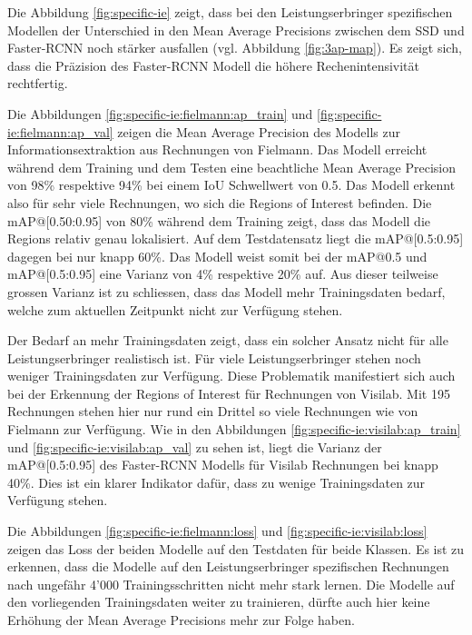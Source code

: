 Die Abbildung \ref{fig:specific-ie} zeigt, dass bei den Leistungserbringer spezifischen Modellen der Unterschied in den Mean Average Precisions zwischen dem SSD und Faster-RCNN noch stärker ausfallen (vgl. Abbildung \ref{fig:3ap-map}). Es zeigt sich, dass die Präzision des Faster-RCNN Modell die höhere Rechenintensivität rechtfertig.

Die Abbildungen \ref{fig:specific-ie:fielmann:ap_train} und \ref{fig:specific-ie:fielmann:ap_val} zeigen die Mean Average Precision des Modells zur Informationsextraktion aus Rechnungen von Fielmann. Das Modell erreicht während dem Training und dem Testen eine beachtliche Mean Average Precision von 98\% respektive 94\% bei einem IoU Schwellwert von 0.5. Das Modell erkennt also für sehr viele Rechnungen, wo sich die Regions of Interest befinden. Die mAP@[0.50:0.95] von 80\% während dem Training zeigt, dass das Modell die Regions relativ genau lokalisiert. Auf dem Testdatensatz liegt die mAP@[0.5:0.95] dagegen bei nur knapp 60\%. Das Modell weist somit bei der mAP@0.5 und mAP@[0.5:0.95] eine Varianz von 4\% respektive 20\% auf. Aus dieser teilweise grossen Varianz ist zu schliessen, dass das Modell mehr Trainingsdaten bedarf, welche zum aktuellen Zeitpunkt nicht zur Verfügung stehen.

Der Bedarf an mehr Trainingsdaten zeigt, dass ein solcher Ansatz nicht für alle Leistungserbringer realistisch ist. Für viele Leistungserbringer stehen noch weniger Trainingsdaten zur Verfügung. Diese Problematik manifestiert sich auch bei der Erkennung der Regions of Interest für Rechnungen von Visilab. Mit 195 Rechnungen stehen hier nur rund ein Drittel so viele Rechnungen wie von Fielmann zur Verfügung. Wie in den Abbildungen \ref{fig:specific-ie:visilab:ap_train} und \ref{fig:specific-ie:visilab:ap_val} zu sehen ist, liegt die Varianz der mAP@[0.5:0.95] des Faster-RCNN Modells für Visilab Rechnungen bei knapp 40\%. Dies ist ein klarer Indikator dafür, dass zu wenige Trainingsdaten zur Verfügung stehen.

Die Abbildungen \ref{fig:specific-ie:fielmann:loss} und  \ref{fig:specific-ie:visilab:loss} zeigen das Loss der beiden Modelle auf den Testdaten für beide Klassen. Es ist zu erkennen, dass die Modelle auf den Leistungserbringer spezifischen Rechnungen nach ungefähr 4'000 Trainingsschritten nicht mehr stark lernen. Die Modelle auf den vorliegenden Trainingsdaten weiter zu trainieren, dürfte auch hier keine Erhöhung der Mean Average Precisions mehr zur Folge haben.

